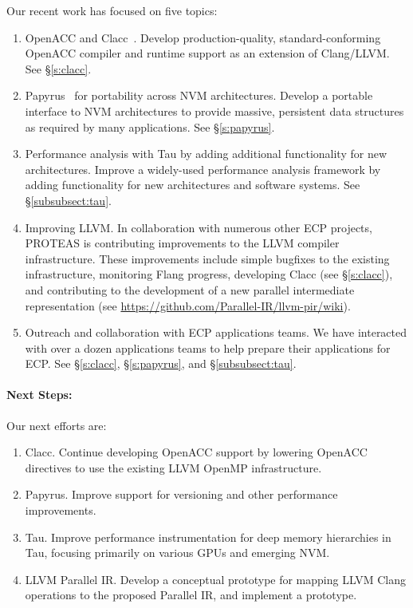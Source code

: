 Our recent work has focused on five topics:

\begin{enumerate}
    
    \item OpenACC and Clacc~\cite{clacc:2018:denny}. Develop production-quality, standard-conforming OpenACC compiler and runtime support as an extension of Clang/LLVM. See \S\ref{s:clacc}.
    
    \item Papyrus~\cite{Kim:2017:DIP,Kim:2017:PHP} for portability across NVM architectures. 
    Develop a portable interface to NVM architectures to provide massive, persistent data structures as required by many applications.
    See \S\ref{s:papyrus}.
    
    \item Performance analysis with Tau by adding additional functionality for new architectures. 
    Improve a widely-used performance analysis framework by adding functionality for new architectures and software systems.
    See \S\ref{subsubsect:tau}.

    \item Improving LLVM. In collaboration with numerous other ECP projects, PROTEAS is contributing improvements to the LLVM compiler infrastructure. These improvements include simple bugfixes to the existing infrastructure, monitoring Flang progress, developing Clacc (see \S\ref{s:clacc}), and contributing to the development of a new parallel intermediate representation (see \url{https://github.com/Parallel-IR/llvm-pir/wiki}).
    
    \item Outreach and collaboration with ECP applications teams. 
    We have interacted with over a dozen applications teams to help prepare their applications for ECP. See \S\ref{s:clacc}, \S\ref{s:papyrus}, and \S\ref{subsubsect:tau}.
    
\end{enumerate}

\paragraph{Next Steps:}

Our next efforts are:

\begin{enumerate}
	\item Clacc. Continue developing OpenACC support by lowering OpenACC directives to use the existing LLVM OpenMP infrastructure.
    
	\item Papyrus. Improve support for versioning and other performance improvements.
    
    \item Tau. Improve performance instrumentation for deep memory hierarchies in Tau, focusing primarily on various GPUs and emerging NVM.
    
    \item LLVM Parallel IR. Develop a conceptual prototype for mapping LLVM Clang operations to the proposed Parallel IR, and implement a prototype.

\end{enumerate}
